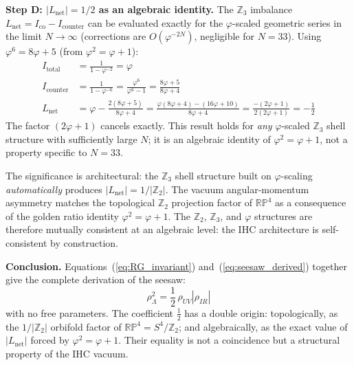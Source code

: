 \documentclass[12pt,a4paper]{article}
\begin{document}
\textbf{Step D: $|L_\mathrm{net}| = 1/2$ as an algebraic identity.}
The $\mathbb{Z}_3$ imbalance $L_\mathrm{net} = I_\mathrm{co} - I_\mathrm{counter}$
can be evaluated exactly for the $\varphi$-scaled geometric series in the limit
$N \to \infty$ (corrections are $O(\varphi^{-2N})$, negligible for $N = 33$).
Using $\varphi^6 = 8\varphi + 5$ (from $\varphi^2 = \varphi+1$):
\begin{align}
  I_\mathrm{total}    &= \frac{1}{1-\varphi^{-2}} = \varphi \\
  I_\mathrm{counter}  &= \frac{1}{1-\varphi^{-6}} = \frac{\varphi^6}{\varphi^6-1}
                         = \frac{8\varphi+5}{8\varphi+4} \\
  L_\mathrm{net}      &= \varphi - \frac{2(8\varphi+5)}{8\varphi+4}
                         = \frac{\varphi(8\varphi+4)-(16\varphi+10)}{8\varphi+4}
                         = \frac{-(2\varphi+1)}{2(2\varphi+1)}
                         = -\frac{1}{2}
  \label{eq:Lnet_proof}
\end{align}
The factor $(2\varphi+1)$ cancels exactly.  This result holds for \emph{any}
$\varphi$-scaled $\mathbb{Z}_3$ shell structure with sufficiently large $N$; it is
an algebraic identity of $\varphi^2 = \varphi+1$, not a property specific to
$N = 33$.

The significance is architectural: the $\mathbb{Z}_3$ shell structure built on
$\varphi$-scaling \emph{automatically} produces $|L_\mathrm{net}| = 1/|\mathbb{Z}_2|$.
The vacuum angular-momentum asymmetry matches the topological $\mathbb{Z}_2$
projection factor of $\mathbb{RP}^4$ as a consequence of the golden ratio identity
$\varphi^2 = \varphi+1$.  The $\mathbb{Z}_2$, $\mathbb{Z}_3$, and $\varphi$
structures are therefore mutually consistent at an algebraic level: the IHC
architecture is self-consistent by construction.

\textbf{Conclusion.}  Equations~(\ref{eq:RG_invariant}) and~(\ref{eq:seesaw_derived})
together give the complete derivation of the seesaw:
\begin{equation}
  \boxed{
    \rho_\Lambda^2 = \frac{1}{2}\,\rho_{UV}|\rho_{IR}|
  }
\end{equation}
with no free parameters.  The coefficient $\tfrac{1}{2}$ has a double origin:
topologically, as the $1/|\mathbb{Z}_2|$ orbifold factor of $\mathbb{RP}^4 = S^4/\mathbb{Z}_2$;
and algebraically, as the exact value of $|L_\mathrm{net}|$ forced by
$\varphi^2 = \varphi+1$.  Their equality is not a coincidence but a structural
property of the IHC vacuum.
\end{document}
